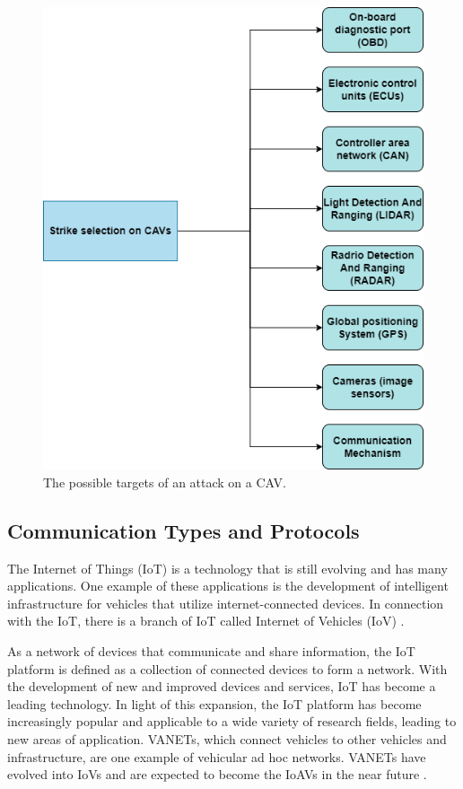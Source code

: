 \documentclass[a4paper,12pt]{article}
\begin{document}
\begin{figure}[H]
  \centering
  \includegraphics[scale=0.60]
  {img/Attack targets}
  \caption{The possible targets of an attack on a CAV.}   
  \label{fig:The possible targets of an attack on a CAV}
\end{figure}


\subsection{Communication Types and Protocols}
\hspace{5mm} The Internet of Things (IoT) is a technology that is still evolving and has many applications. One example of these applications is the development of intelligent infrastructure for vehicles that utilize internet-connected devices. In connection with the IoT, there is a branch of IoT called Internet of Vehicles (IoV) \cite{article23}.

\hspace{5mm} As a network of devices that communicate and share information, the IoT platform is defined as a collection of connected devices to form a network. With the development of new and improved devices and services, IoT has become a leading technology. In light of this expansion, the IoT platform has become increasingly popular and applicable to a wide variety of research fields, leading to new areas of application. VANETs, which connect vehicles to other vehicles and infrastructure, are one example of vehicular ad hoc networks. VANETs have evolved into IoVs and are expected to become the IoAVs in the near future \cite{article23}.
\end{document}
